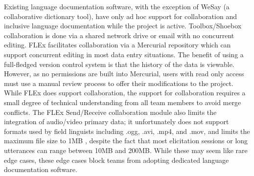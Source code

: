 \documentclass[11pt]{article}
\newcommand{\smalltodo}[2][]
    {\todo[caption={#2}, #1]
    {\tiny#2\normalsize}}
\begin{document}
Existing language documentation software,  with the exception of WeSay (a
collaborative dictionary tool), have only ad hoc support for collaboration and
inclusive language documentation while the project is active. Toolbox/Shoebox
collaboration is done via a shared network drive or email with no concurrent
editing. FLEx  facilitates collaboration via a Mercurial repository
\cite{FLExSendReceive:2013:Online} which can  support concurrent 
editing in most data entry situations. The benefit of using a full-fledged
version control system is that the history of the data is viewable. 
However, as no permissions are built into Mercurial, users with read only
access must use a manual review process to offer their modifications to the
project.
While FLEx does support collaboration,
the support for collaboration requires a small degree of technical
understanding from all team members to avoid merge conflicts.  The FLEx
Send/Receive  collaboration module also limits the integration of audio/video primary data; it
 unfortunately does not support formats used by field linguists including .ogg, .avi, .mp4, and .mov, and limits the maximum file size to 1MB  \cite{FLExSendReceive:2013:Online}, despite the fact that most elicitation sessions or long utterances can range between 10MB and 200MB. While these may seem like rare edge cases, these edge cases block teams from adopting dedicated language documentation software.

% 
\end{document}
